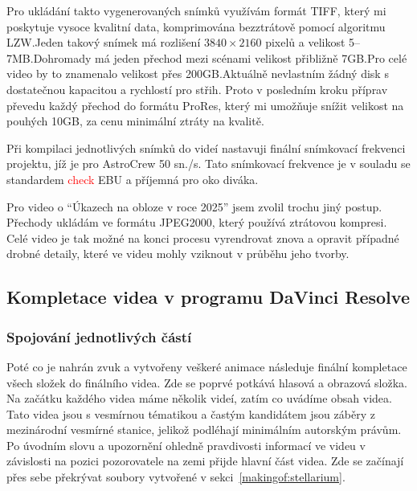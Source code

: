 \documentclass[12pt,a4paper,titlepage]{article}
\begin{document}
Pro ukládání takto vygenerovaných snímků využívám formát TIFF, který mi poskytuje vysoce kvalitní data, komprimována bezztrátově pomocí algoritmu LZW.\@ Jeden takový snímek má rozlišení \(3840\times2160\) pixelů a velikost 5--7MB.\@ Dohromady má jeden přechod mezi scénami velikost přibližně 7GB.\@ Pro celé video by to znamenalo velikost přes 200GB.\@ Aktuálně nevlastním žádný disk s dostatečnou kapacitou a rychlostí pro střih. Proto v posledním kroku příprav převedu každý přechod do formátu ProRes, který mi umožňuje snížit velikost na pouhých 10GB, za cenu minimální ztráty na kvalitě. 

Při kompilaci jednotlivých snímků do videí nastavuji finální snímkovací frekvenci projektu, jíž je pro AstroCrew 50 sn./s. Tato snímkovací frekvence je v souladu se standardem \textcolor{red}{check} EBU a příjemná pro oko diváka.

Pro video o \enquote{Úkazech na obloze v roce 2025} jsem zvolil trochu jiný postup. Přechody ukládám ve formátu JPEG2000, který používá ztrátovou kompresi. Celé video je tak možné na konci procesu vyrendrovat znova a opravit případné drobné detaily, které ve videu mohly vziknout v průběhu jeho tvorby.
\subsection{Kompletace videa v programu DaVinci Resolve}\label{makingof:resolve}
\subsubsection{Spojování jednotlivých částí}\label{makingof:resolve:merging}
Poté co je nahrán zvuk a vytvořeny veškeré animace následuje finální kompletace všech složek do finálního videa. Zde se poprvé potkává hlasová a obrazová složka. Na začátku každého videa máme několik videí, zatím co uvádíme obsah videa. Tato videa jsou s vesmírnou tématikou a častým kandidátem jsou záběry z mezinárodní vesmírné stanice, jelikož podléhají minimálním autorským právům. Po úvodním slovu a upozornění ohledně pravdivosti informací ve videu v závislosti na pozici pozorovatele na zemi přijde hlavní část videa. Zde se začínají přes sebe překrývat soubory vytvořené v sekci~\ref{makingof:stellarium}.
\end{document}
